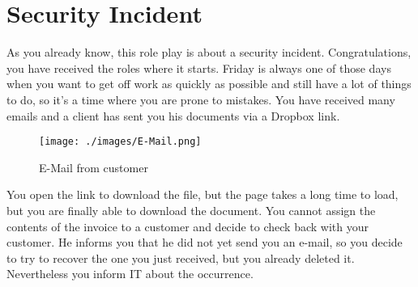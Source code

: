 \section*{Security Incident}
As you already know, this role play is about a security incident. Congratulations, you have received the roles where it starts.
Friday is always one of those days when you want to get off work as quickly as possible and still have a lot of things to do, so it's a time where you are prone to mistakes. You 
have received many emails and a client has sent you his documents via a Dropbox link.
\begin{figure}[H]
    \centering
    \texttt{[image: ./images/E-Mail.png]}
    \caption{E-Mail from customer}
  \end{figure}
You open the link to download the file, but the page takes a long time to load, but you are finally able to download the document.
You cannot assign the contents of the invoice to a customer and decide to check back with your customer.
He informs you that he did not yet send you an e-mail, so you decide to try to recover the one you just received, but you already deleted it.
Nevertheless you inform IT about the occurrence.
